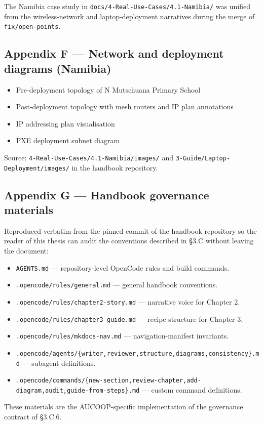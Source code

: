 The Namibia case study in \texttt{docs/4-Real-Use-Cases/4.1-Namibia/}
was unified from the wireless-network and laptop-deployment narratives
during the merge of \texttt{fix/open-points}.

\hypertarget{appendix-f-network-and-deployment-diagrams-namibia}{%
\subsection{Appendix F --- Network and deployment diagrams
(Namibia)}\label{appendix-f-network-and-deployment-diagrams-namibia}}

\begin{itemize}
\tightlist
\item
  Pre-deployment topology of N Mutschuana Primary School
\item
  Post-deployment topology with mesh routers and IP plan annotations
\item
  IP addressing plan visualisation
\item
  PXE deployment subnet diagram
\end{itemize}

Source: \texttt{4-Real-Use-Cases/4.1-Namibia/images/} and
\texttt{3-Guide/Laptop-Deployment/images/} in the handbook repository.

\hypertarget{appendix-g-handbook-governance-materials}{%
\subsection{Appendix G --- Handbook governance
materials}\label{appendix-g-handbook-governance-materials}}

Reproduced verbatim from the pinned commit of the handbook repository so
the reader of this thesis can audit the conventions described in §3.C
without leaving the document:

\begin{itemize}
\tightlist
\item
  \texttt{AGENTS.md} --- repository-level OpenCode rules and build
  commands.
\item
  \texttt{.opencode/rules/general.md} --- general handbook conventions.
\item
  \texttt{.opencode/rules/chapter2-story.md} --- narrative voice for
  Chapter 2.
\item
  \texttt{.opencode/rules/chapter3-guide.md} --- recipe structure for
  Chapter 3.
\item
  \texttt{.opencode/rules/mkdocs-nav.md} --- navigation-manifest
  invariants.
\item
  \texttt{.opencode/agents/\{writer,reviewer,structure,diagrams,consistency\}.md}
  --- subagent definitions.
\item
  \texttt{.opencode/commands/\{new-section,review-chapter,add-diagram,audit,guide-from-steps\}.md}
  --- custom command definitions.
\end{itemize}

These materials are the AUCOOP-specific implementation of the governance
contract of §3.C.6.
